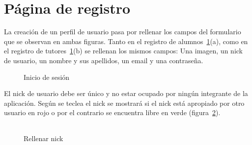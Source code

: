 \documentclass[a4paper, 12pt]{book}
\begin{document}
\section{P\'agina de registro}
La creaci\'on de un perfil de usuario pasa por rellenar los campos del formulario que se observan en ambas figuras. Tanto en el registro de  
alumnos~\ref{figura:registro}(a), como en el registro de tutores~\ref{figura:registro}(b) se rellenan los mismos campos: Una imagen, un nick de usuario,
un nombre y sus apellidos, un email y una contrase\~na.
\begin{figure}[htbp] 
  \centering
  \caption{Inicio de sesi\'on}
  \label{figura:registro}
\end{figure}

El nick de usuario debe ser \'unico y no estar ocupado por ning\'un integrante de la aplicaci\'on. Seg\'un se teclea el nick se mostrar\'a si el nick est\'a 
apropiado por otro usuario en rojo o por el contrario se encuentra libre en verde (figura~\ref{figura:registro1}).\\\\
\begin{figure}[htbp]
  \centering
  \caption{Rellenar nick}
  \label{figura:registro1}
\end{figure}
\end{document}
